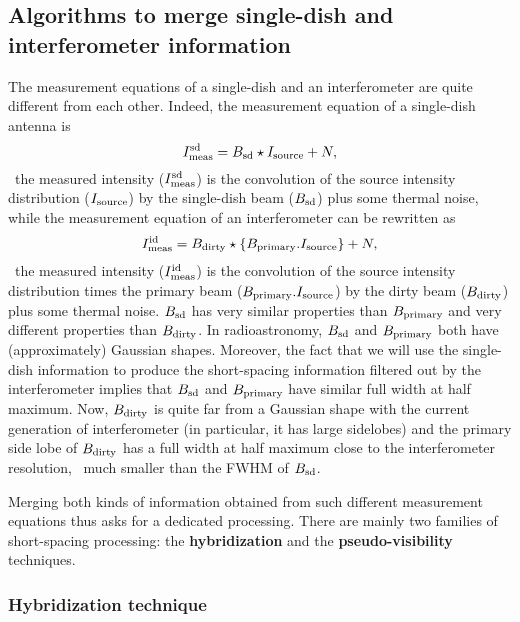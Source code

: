 \subsection{Algorithms to merge single-dish and interferometer information}

The measurement equations of a single-dish and an interferometer are quite
different from each other. Indeed, the measurement equation of a
single-dish antenna is
\begin{equation}
  I_{\mathrm{meas}}^{\mathrm{sd}} = B_{\mathrm{sd}} \star I_{\mathrm{source}} + N,
\end{equation}
\ie\ the measured intensity ($I_{\mathrm{meas}}^{\mathrm{sd}}$) is the convolution of
the source intensity distribution ($I_{\mathrm{source}}$) by the single-dish
beam ($B_{\mathrm{sd}}$) plus some thermal noise, while the measurement equation
of an interferometer can be rewritten as
\begin{equation}
  I_{\mathrm{meas}}^{\mathrm{id}} = B_{\mathrm{dirty}} \star \displaystyle\left\{ B_{\mathrm{primary}}.I_{\mathrm{source}} \right\} + N,
\end{equation}
\ie\ the measured intensity ($I_{\mathrm{meas}}^{\mathrm{id}}$) is the convolution
of the source intensity distribution times the primary beam
($B_{\mathrm{primary}}.I_{\mathrm{source}}$) by the dirty beam ($B_{\mathrm{dirty}}$) plus
some thermal noise. $B_{\mathrm{sd}}$ has very similar properties than
$B_{\mathrm{primary}}$ and very different properties than $B_{\mathrm{dirty}}$.  In
radioastronomy, $B_{\mathrm{sd}}$ and $B_{\mathrm{primary}}$ both have (approximately)
Gaussian shapes. Moreover, the fact that we will use the single-dish information to
produce the short-spacing information filtered out by the interferometer
implies that $B_{\mathrm{sd}}$ and $B_{\mathrm{primary}}$ have similar full width at
half maximum. Now, $B_{\mathrm{dirty}}$ is quite far from a Gaussian shape with
the current generation of interferometer (in particular, it has large
sidelobes) and the primary side lobe of $B_{\mathrm{dirty}}$ has a full width at
half maximum close to the interferometer resolution, \ie\ much smaller than
the FWHM of $B_{\mathrm{sd}}$.

Merging both kinds of information obtained from such different measurement
equations thus asks for a dedicated processing. There are mainly two
families of short-spacing processing: the \textbf{hybridization} and the
\textbf{pseudo-visibility} techniques.

\subsubsection{Hybridization technique}

